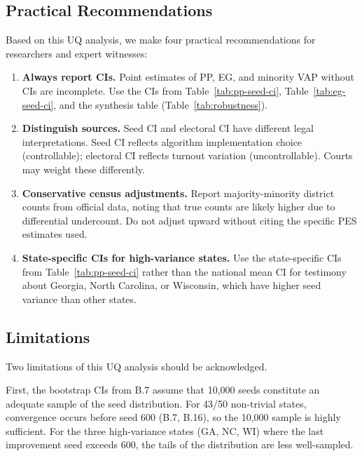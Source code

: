 \subsection{Practical Recommendations}

Based on this UQ analysis, we make four practical recommendations
for researchers and expert witnesses:

\begin{enumerate}
  \item \textbf{Always report CIs.} Point estimates of PP, EG, and
    minority VAP without CIs are incomplete. Use the CIs from
    Table~\ref{tab:pp-seed-ci}, Table~\ref{tab:eg-seed-ci}, and
    the synthesis table (Table~\ref{tab:robustness}).

  \item \textbf{Distinguish sources.} Seed CI and electoral CI have
    different legal interpretations. Seed CI reflects algorithm
    implementation choice (controllable); electoral CI reflects
    turnout variation (uncontrollable). Courts may weight these
    differently.

  \item \textbf{Conservative census adjustments.} Report majority-minority
    district counts from official data, noting that true counts are
    likely higher due to differential undercount. Do not adjust
    upward without citing the specific PES estimates used.

  \item \textbf{State-specific CIs for high-variance states.} Use the
    state-specific CIs from Table~\ref{tab:pp-seed-ci} rather than
    the national mean CI for testimony about Georgia, North Carolina,
    or Wisconsin, which have higher seed variance than other states.
\end{enumerate}

\subsection{Limitations}

Two limitations of this UQ analysis should be acknowledged.

First, the bootstrap CIs from B.7 assume that 10,000 seeds constitute
an adequate sample of the seed distribution. For 43/50 non-trivial
states, convergence occurs before seed 600 (B.7, B.16), so the 10,000
sample is highly sufficient. For the three high-variance states
(GA, NC, WI) where the last improvement seed exceeds 600, the tails
of the distribution are less well-sampled.

